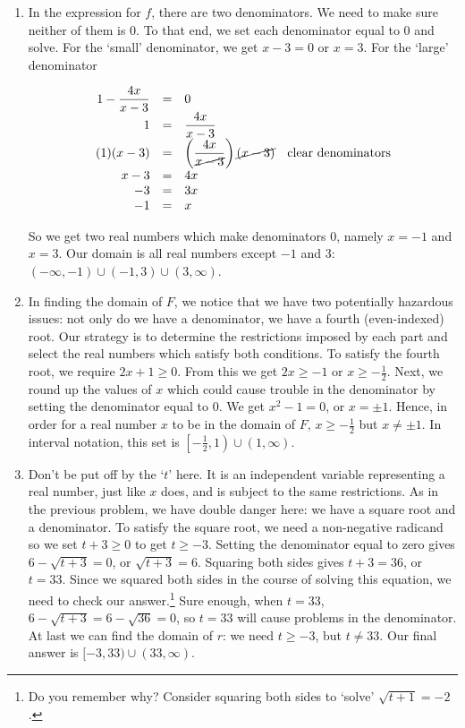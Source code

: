 \begin{ex}
\begin{enumerate}
\item  In the expression for $f$, there are two denominators.  We need to make sure neither of them is $0$.  To that end, we set each denominator equal to $0$ and solve.  For the `small' denominator, we get $x - 3 = 0$ or $x=3$.  For the `large' denominator

\setlength{\extrarowheight}{10pt}

\[ \begin{array}{rclr}  
1 - \dfrac{4x}{x-3} & = & 0  & \\
                  1 & = & \dfrac{4x}{x-3} & \\ 
           (1)(x-3) & = & \left(\dfrac{4x}{\cancel{x-3}}\right)\cancel{(x-3)} & \mbox{clear denominators}  \\
              x - 3 & = &  4x & \\
                 -3 & = & 3x \\
                 -1 & = & x 
\end{array} \]

\setlength{\extrarowheight}{2pt} 
So we get two real numbers which make denominators $0$, namely $x = -1$ and $x=3$.  Our domain is all real numbers except $-1$ and $3$:  $(-\infty, -1) \cup (-1,3) \cup (3, \infty)$.


\item  In finding the domain of $F$, we notice that we have two potentially hazardous issues:  not only do we have a denominator, we have a fourth (even-indexed) root.  Our strategy is to determine the restrictions imposed by each part and select the real numbers which satisfy both conditions.  To satisfy the fourth root,  we require $2x+1 \geq 0$.  From this we get $2x \geq -1$ or $x \geq -\frac{1}{2}$.  Next, we round up the values of $x$ which could cause trouble in the denominator by setting the denominator equal to $0$.  We get $x^2 - 1=0$, or $x = \pm 1$.  Hence, in order for a real number $x$ to be in the domain of $F$, $x \geq -\frac{1}{2}$ but $x \neq \pm 1$.  In interval notation, this set is $\left[ -\frac{1}{2}, 1 \right) \cup (1, \infty)$. 

\item    Don't be put off by the `$t$' here. It is an independent variable representing a real number, just like $x$ does, and is subject to the same restrictions.  As in the previous problem, we have double danger here:  we have a square root and a denominator.   To satisfy the square root, we need a non-negative radicand so we set $t + 3 \geq 0$ to get $t \geq -3$.  Setting the denominator equal to zero gives $6 - \sqrt{t+3} =0$, or $\sqrt{t+3} = 6$.  Squaring both sides gives $t+3 = 36$, or $t = 33$. Since we squared both sides in the course of solving this equation, we need to check our answer.\footnote{Do you remember why?  Consider squaring both sides to `solve' $\sqrt{t+1} = -2$.}  Sure enough, when $t=33$, $6 - \sqrt{t+3} = 6 - \sqrt{36} = 0$, so $t=33$ will cause problems in the denominator.  At last we can find the domain of $r$:  we need $t \geq -3$, but $t \neq 33$.  Our final answer is  $[-3, 33) \cup (33, \infty)$.


\end{enumerate}
\end{ex}
